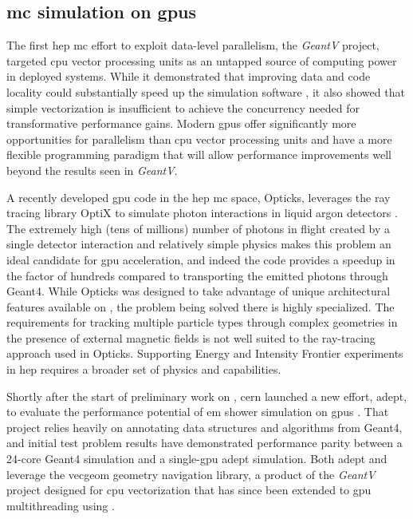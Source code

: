 \subsection{\ac{mc} simulation on \acsp{gpu}}

The first \ac{hep} \ac{mc} effort to exploit data-level parallelism, the
\emph{GeantV} project, targeted \ac{cpu} vector processing units as an untapped
source of computing power in deployed systems. While it demonstrated that
improving data and code locality could substantially speed up the simulation
software \cite{GeantV_Results_2020}, it also showed that simple vectorization is
insufficient to achieve the concurrency needed for transformative performance
gains. Modern \acp{gpu} offer significantly more opportunities for parallelism
than \ac{cpu} vector processing units and have a more flexible programming
paradigm that will allow performance improvements well beyond the results seen
in \emph{GeantV}.

A recently developed \ac{gpu} code in the \ac{hep} \ac{mc} space, Opticks,
leverages the \nvidia ray tracing library OptiX to simulate photon interactions
in liquid argon detectors \cite{blyth_opticks_2019}. The extremely high (tens of
millions) number of photons in flight created by a single detector interaction
and relatively simple physics makes this problem an ideal candidate for \ac{gpu}
acceleration, and indeed the code provides a speedup in the factor of hundreds
compared to transporting the emitted photons through Geant4. While Opticks was
designed to take advantage of unique architectural features available on
\nvidia, the problem being solved there is highly specialized.  The requirements
for tracking multiple particle types through complex geometries in the presence
of external magnetic fields is not well suited to the ray-tracing approach used
in Opticks.  Supporting Energy and Intensity Frontier experiments in \ac{hep}
requires a broader set of physics and capabilities.

Shortly after the start of preliminary work on \celeritas, \acs{cern} launched a
new effort, \acs{adept}, to evaluate the performance potential of \ac{em} shower
simulation on \acp{gpu} \cite{andrei_gheata_adept_2020}. That project relies
heavily on annotating data structures and algorithms from Geant4, and initial
test problem results \cite{andrei_gheata_adept_2021,hahnfield_2021} have
demonstrated performance parity between a 24-core Geant4 simulation and a
single-\ac{gpu} \acs{adept} simulation. Both \acs{adept} and \celeritas leverage
the \acs{vecgeom} geometry navigation library, a product of the \emph{GeantV}
project designed for \ac{cpu} vectorization that has since been extended to
\ac{gpu} multithreading using \cuda \cite{apostolakis_towards_2015}.

